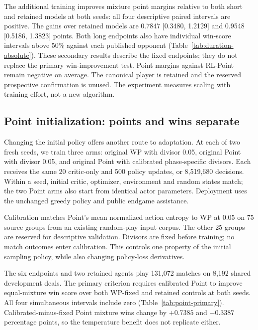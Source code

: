 The additional training improves mixture point margins relative to both short
and retained models at both seeds: all four descriptive paired intervals are
positive. The gains over retained models are 0.7847 [0.3480, 1.2129] and
0.9548 [0.5186, 1.3823] points. Both long endpoints also have individual
win-score intervals above 50\% against each published opponent
(Table~\ref{tab:duration-absolute}). These secondary results describe the
fixed endpoints; they do not replace the primary win-improvement test.
Point margins against RL-Point remain negative on average. The canonical
player is retained and the reserved prospective confirmation is unused.
The experiment measures scaling with training effort, not a new algorithm.

\begin{table}[htbp]
\centering\small

\caption{Long endpoints on development deals. Intervals are descriptive
marginal 95\%, not simultaneous across opponents or endpoints.}
\label{tab:duration-absolute}
\end{table}

\subsection{Point initialization: points and wins separate}
\label{sec:point-initialization}
Changing the initial policy offers another route to adaptation. At each of two
fresh seeds, we train three arms: original WP with divisor 0.05, original Point
with divisor 0.05, and original Point with calibrated phase-specific divisors.
Each receives the same 20 critic-only and 500 policy updates, or 8,519,680
decisions. Within a seed, initial critic, optimizer, environment and random
states match; the two Point arms also start from identical actor parameters.
Deployment uses the unchanged greedy policy and public endgame assistance.

Calibration matches Point's mean normalized action entropy to WP at 0.05 on
75 source groups from an existing random-play input corpus. The other 25 groups
are reserved for descriptive validation. Divisors are fixed before training;
no match outcomes enter calibration. This controls one property of the initial
sampling policy, while also changing policy-loss derivatives.

The six endpoints and two retained agents play 131,072 matches on 8,192 shared
development deals. The primary criterion requires calibrated Point to improve
equal-mixture win score over both WP-fixed and retained controls at both seeds.
All four simultaneous intervals include zero (Table~\ref{tab:point-primary}).
Calibrated-minus-fixed Point mixture wins change by $+0.7385$ and $-0.3387$
percentage points, so the temperature benefit does not replicate either.

